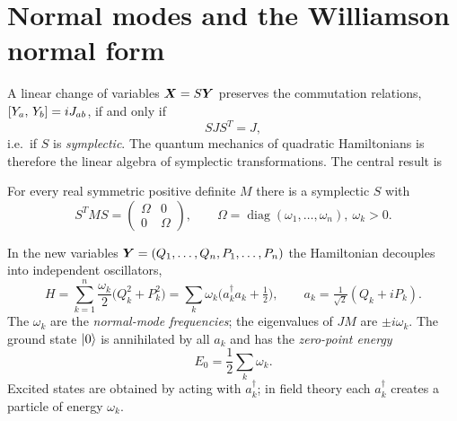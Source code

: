 \section{Normal modes and the Williamson normal form}
A linear change of variables $\bm{X} = S\bm{Y}$ preserves the commutation relations, $[Y_a,\,Y_b] = iJ_{ab}$,
if and only if
\begin{equation}
  S J S^T = J ,
\end{equation}
i.e.\ if $S$ is \emph{symplectic}. The quantum mechanics of quadratic Hamiltonians is therefore the linear
algebra of symplectic transformations. The central result is
\begin{theorem}\label{thm:williamson}
For every real symmetric positive definite $M$ there is a symplectic $S$ with
\begin{equation}
  S^T M S = \begin{pmatrix} \Omega & 0 \\ 0 & \Omega \end{pmatrix}, \qquad
  \Omega = \operatorname{diag}(\omega_1,\dots,\omega_n),\ \omega_k > 0 .
\end{equation}
\end{theorem}
In the new variables $\bm{Y} = (Q_1,\dots,Q_n,P_1,\dots,P_n)$ the Hamiltonian decouples into independent
oscillators,
\begin{equation}
  H = \sum_{k=1}^n \frac{\omega_k}{2}\bigl(Q_k^2 + P_k^2\bigr)
    = \sum_k \omega_k \bigl(a_k^\dagger a_k + \tfrac12\bigr),\qquad a_k = \tfrac{1}{\sqrt2}(Q_k + iP_k).
\end{equation}
The $\omega_k$ are the \emph{normal-mode frequencies}; the eigenvalues of $JM$ are $\pm i\omega_k$. The ground
state $\lvert 0\rangle$ is annihilated by all $a_k$ and has the \emph{zero-point energy}
\begin{equation}\label{eq:E0}
  E_0 = \frac12\sum_k \omega_k .
\end{equation}
Excited states are obtained by acting with $a_k^\dagger$; in field theory each $a_k^\dagger$ creates a particle
of energy $\omega_k$.

